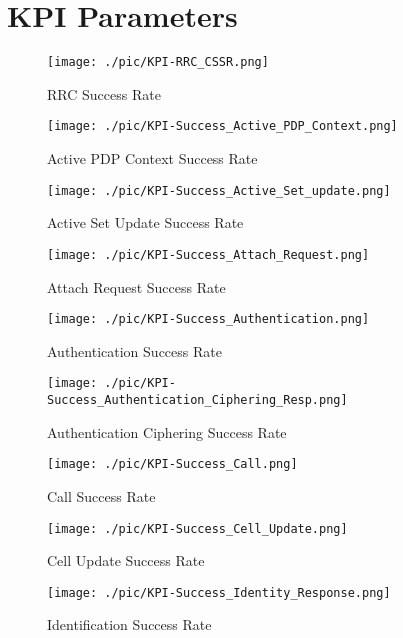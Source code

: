\chapter{KPI Parameters}

\clearpage
\vfill
\begin{figure}[H]\centering
\texttt{[image: ./pic/KPI-RRC\_CSSR.png]}
\caption{RRC Success Rate}
\end{figure}
\vfill

\clearpage
\vfill
\begin{figure}[H]\centering
\texttt{[image: ./pic/KPI-Success\_Active\_PDP\_Context.png]}
\caption{Active PDP Context Success Rate}
\end{figure}
\vfill

\clearpage
\vfill
\begin{figure}[H]\centering
\texttt{[image: ./pic/KPI-Success\_Active\_Set\_update.png]}
\caption{Active Set Update Success Rate}
\end{figure}
\vfill

\clearpage
\vfill
\begin{figure}[H]\centering
\texttt{[image: ./pic/KPI-Success\_Attach\_Request.png]}
\caption{Attach Request Success Rate}
\end{figure}
\vfill

\clearpage
\vfill
\begin{figure}[H]\centering
\texttt{[image: ./pic/KPI-Success\_Authentication.png]}
\caption{Authentication Success Rate}
\end{figure}
\vfill

\clearpage
\vfill
\begin{figure}[H]\centering
\texttt{[image: ./pic/KPI-Success\_Authentication\_Ciphering\_Resp.png]}
\caption{Authentication Ciphering Success Rate}
\end{figure}
\vfill

\clearpage
\vfill
\begin{figure}[H]\centering
\texttt{[image: ./pic/KPI-Success\_Call.png]}
\caption{Call Success Rate}
\end{figure}
\vfill

\clearpage
\vfill
\begin{figure}[H]\centering
\texttt{[image: ./pic/KPI-Success\_Cell\_Update.png]}
\caption{Cell Update Success Rate}
\end{figure}
\vfill

\clearpage
\vfill
\begin{figure}[H]\centering
\texttt{[image: ./pic/KPI-Success\_Identity\_Response.png]}
\caption{Identification Success Rate}
\end{figure}
\vfill

